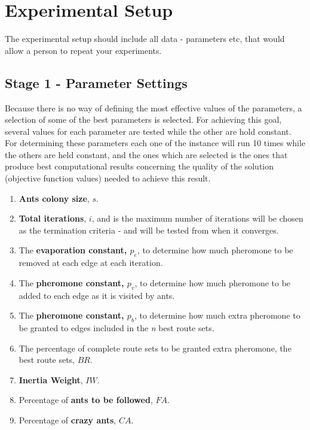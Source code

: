 \section{Experimental Setup}

The experimental setup should include all data - parameters etc, that would allow a person to repeat your experiments. 
 
\subsection{Stage 1 - Parameter Settings}
\label{subsec:parameterSettings_setup}

Because there is no way of defining the most effective values of the parameters, a selection of some of the best parameters is selected. For achieving this goal, several values for each parameter are tested while the other are hold constant. For determining these parameters each one of the instance will run 10 times while the others are held constant, and the ones which are selected is the ones that produce best computational results concerning the quality of the solution (objective function values) needed to achieve this result. 

\begin{enumerate}
\item \textbf{Ants colony size}, $s$.
\item \textbf{Total iterations}, $i$, and is the maximum number of iterations will be chosen as the termination criteria - and will be tested from when it converges. 
\item The \textbf{evaporation constant, $p_{e}$}, to determine how much pheromone to be removed at each edge at each iteration. 
\item The \textbf{pheromone constant, $p_{v}$}, to determine how much pheromone to be added to each edge as it is visited by ants. 
\item The \textbf{pheromone constant, $p_{b}$}, to determine how much extra pheromone to be granted to edges included in the \textit{n} best route sets.
\item The percentage of complete route sets to be granted extra pheromone, the best route sets, $BR$.
\item \textbf{Inertia Weight}, $IW$.
\item Percentage of \textbf{ants to be followed}, $FA$.
\item Percentage of \textbf{crazy ants}, $CA$.
\end{enumerate}

